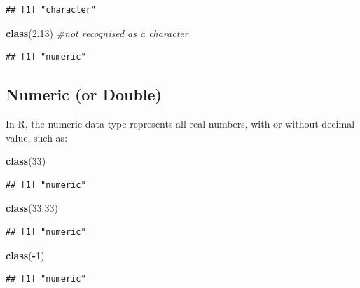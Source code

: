 \documentclass[
]{book}
\newenvironment{Shaded}{\begin{snugshade}}{\end{snugshade}}
\newcommand{\CommentTok}[1]{\textcolor[rgb]{0.56,0.35,0.01}{\textit{#1}}}
\newcommand{\DecValTok}[1]{\textcolor[rgb]{0.00,0.00,0.81}{#1}}
\newcommand{\FloatTok}[1]{\textcolor[rgb]{0.00,0.00,0.81}{#1}}
\newcommand{\FunctionTok}[1]{\textcolor[rgb]{0.13,0.29,0.53}{\textbf{#1}}}
\newcommand{\NormalTok}[1]{#1}
\newcommand{\SpecialCharTok}[1]{\textcolor[rgb]{0.81,0.36,0.00}{\textbf{#1}}}
\begin{document}
\begin{verbatim}
## [1] "character"
\end{verbatim}

\begin{Shaded}
\begin{Highlighting}[]
\FunctionTok{class}\NormalTok{(}\FloatTok{2.13}\NormalTok{) }\CommentTok{\#not recognised as a character}
\end{Highlighting}
\end{Shaded}

\begin{verbatim}
## [1] "numeric"
\end{verbatim}

\hypertarget{numeric-or-double}{%
\subsection{Numeric (or Double)}\label{numeric-or-double}}

In R, the numeric data type represents all real numbers, with or without decimal value, such as:

\begin{Shaded}
\begin{Highlighting}[]
\FunctionTok{class}\NormalTok{(}\DecValTok{33}\NormalTok{)}
\end{Highlighting}
\end{Shaded}

\begin{verbatim}
## [1] "numeric"
\end{verbatim}

\begin{Shaded}
\begin{Highlighting}[]
\FunctionTok{class}\NormalTok{(}\FloatTok{33.33}\NormalTok{)}
\end{Highlighting}
\end{Shaded}

\begin{verbatim}
## [1] "numeric"
\end{verbatim}

\begin{Shaded}
\begin{Highlighting}[]
\FunctionTok{class}\NormalTok{(}\SpecialCharTok{{-}}\DecValTok{1}\NormalTok{)}
\end{Highlighting}
\end{Shaded}

\begin{verbatim}
## [1] "numeric"
\end{verbatim}
\end{document}
